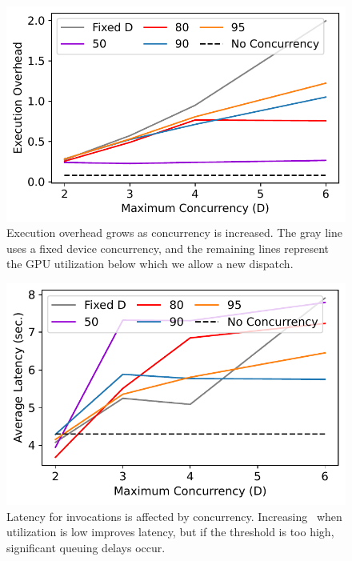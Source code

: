 \begin{figure}
  \centering
  \includegraphics{mqfq/graphs/concurrency/25.7/paper_exec_overhead.pdf}
  \caption{Execution overhead grows as concurrency is increased.
  The gray line uses a fixed device concurrency, and the remaining lines represent the GPU utilization below which we allow a new dispatch.}
    \label{fig:concur-exec-overhead}
\end{figure}
\begin{figure}
  \centering
  \includegraphics{mqfq/graphs/concurrency/25.7/paper_e2e_sec.pdf}
  \caption{Latency for invocations is affected by concurrency.
  Increasing \D~when utilization is low improves latency, but if the threshold is too high, significant queuing delays occur.}
  \label{fig:concur-e2e}
\end{figure}
